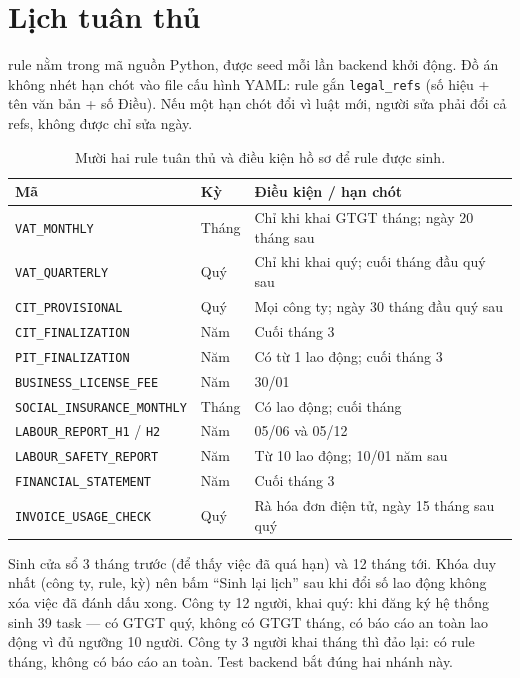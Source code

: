\section{Lịch tuân thủ}

\soRule{} rule nằm trong mã nguồn Python, được seed mỗi lần backend khởi động. Đồ án không
nhét hạn chót vào file cấu hình YAML: rule gắn \texttt{legal\_refs} (số hiệu +
tên văn bản + số Điều). Nếu một hạn chót đổi vì luật mới, người sửa phải đổi
cả refs, không được chỉ sửa ngày.

\begin{table}[htp]
\centering
\caption{Mười hai rule tuân thủ và điều kiện hồ sơ để rule được sinh.}
\label{tab:compliance-rules}
\begin{tabular}{p{4.4cm}p{3.0cm}p{6.4cm}}
\toprule
\textbf{Mã} & \textbf{Kỳ} & \textbf{Điều kiện / hạn chót} \\
\midrule
\texttt{VAT\_MONTHLY} & Tháng & Chỉ khi khai GTGT tháng; ngày 20 tháng sau \\
\texttt{VAT\_QUARTERLY} & Quý & Chỉ khi khai quý; cuối tháng đầu quý sau \\
\texttt{CIT\_PROVISIONAL} & Quý & Mọi công ty; ngày 30 tháng đầu quý sau \\
\texttt{CIT\_FINALIZATION} & Năm & Cuối tháng 3 \\
\texttt{PIT\_FINALIZATION} & Năm & Có từ 1 lao động; cuối tháng 3 \\
\texttt{BUSINESS\_LICENSE\_FEE} & Năm & 30/01 \\
\texttt{SOCIAL\_INSURANCE\_MONTHLY} & Tháng & Có lao động; cuối tháng \\
\texttt{LABOUR\_REPORT\_H1} / \texttt{H2} & Năm & 05/06 và 05/12 \\
\texttt{LABOUR\_SAFETY\_REPORT} & Năm & Từ 10 lao động; 10/01 năm sau \\
\texttt{FINANCIAL\_STATEMENT} & Năm & Cuối tháng 3 \\
\texttt{INVOICE\_USAGE\_CHECK} & Quý & Rà hóa đơn điện tử, ngày 15 tháng sau quý \\
\bottomrule
\end{tabular}
\end{table}

Sinh cửa sổ 3 tháng trước (để thấy việc đã quá hạn) và 12 tháng tới. Khóa duy
nhất (công ty, rule, kỳ) nên bấm ``Sinh lại lịch'' sau khi đổi số lao động không
xóa việc đã đánh dấu xong. Công ty 12 người, khai quý: khi đăng ký hệ thống sinh 39
task --- có GTGT quý, không có GTGT tháng, có báo cáo an toàn lao động vì đủ
ngưỡng 10 người. Công ty 3 người khai tháng thì đảo lại: có rule tháng, không
có báo cáo an toàn. Test backend bắt đúng hai nhánh này.

